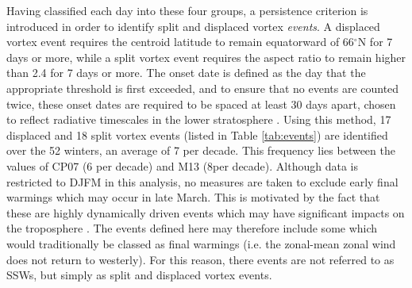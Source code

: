 Having classified each day into these four groups, a persistence criterion is
introduced in order to identify split and displaced vortex \emph{events}. A
displaced vortex event requires the centroid latitude to remain equatorward of
66$^{\circ}$N for 7 days or more, while a split vortex event requires the aspect
ratio to remain higher than 2.4 for 7 days or more. The onset date is defined as
the day that the appropriate threshold is first exceeded, and to ensure that no
events are counted twice, these onset dates are required to be spaced at least
30 days apart, chosen to reflect radiative timescales in the lower stratosphere
\citep{Newman1997}. Using this method, 17 displaced and 18 split vortex events
(listed in Table \ref{tab:events}) are identified over the 52 winters, an
average of 7 per decade. This frequency lies between the values of CP07 (6 per
decade) and M13 (8per decade). Although data is restricted to DJFM in this
analysis, no measures are taken to exclude early final warmings which may occur
in late March. This is motivated by the fact that these are highly dynamically
driven events which may have significant impacts on the troposphere
\citep{Hardiman2011}. The events defined here may therefore include some which
would traditionally be classed as final warmings (i.e. the zonal-mean zonal wind
does not return to westerly). For this reason, there events are not referred to
as SSWs, but simply as split and displaced vortex events.

